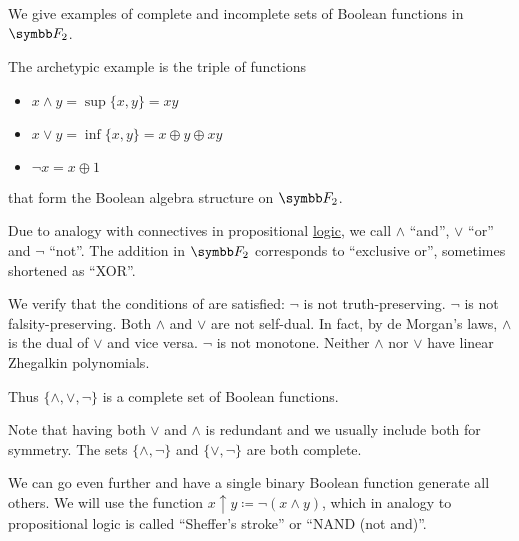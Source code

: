 \begin{example}\label{ex:posts_completeness_theorem}
  We give examples of complete and incomplete sets of Boolean functions in \( \BF_2 \).

  \begin{ExEnum}
     The archetypic example is the triple of functions
    \begin{itemize}
      \item \( x \wedge y = \sup \{ x, y \} = xy \)
      \item \( x \vee y = \inf \{ x, y \} = x \oplus y \oplus xy \)
      \item \( \neg x = x \oplus 1 \)
    \end{itemize}
    that form the Boolean algebra structure on \( \BF_2 \).

    Due to analogy with connectives in propositional \hyperref[def:propositional_language]{logic}, we call \( \wedge \) \enquote{and}, \( \vee \) \enquote{or} and \( \neg \) \enquote{not}. The addition in \( \BF_2 \) corresponds to \enquote{exclusive or}, sometimes shortened as \enquote{XOR}.

    We verify that the conditions of  are satisfied:
     \( \neg \) is not truth-preserving.
     \( \neg \) is not falsity-preserving.
     Both \( \wedge \) and \( \vee \) are not self-dual. In fact, by de Morgan's laws, \( \wedge \) is the dual of \( \vee \) and vice versa.
     \( \neg \) is not monotone.
     Neither \( \wedge \) nor \( \vee \) have linear Zhegalkin polynomials.

    Thus \( \{ \wedge, \vee, \neg \} \) is a complete set of Boolean functions.

    Note that having both \( \vee \) and \( \wedge \) is redundant and we usually include both for symmetry. The sets \( \{ \wedge, \neg \} \) and \( \{ \vee, \neg \} \) are both complete.

     We can go even further and have a single binary Boolean function generate all others. We will use the function \( x \uparrow y \coloneqq \neg(x \wedge y) \), which in analogy to propositional logic is called \enquote{Sheffer's stroke} or \enquote{NAND (not and)}.


\end{ExEnum}
\end{example}
